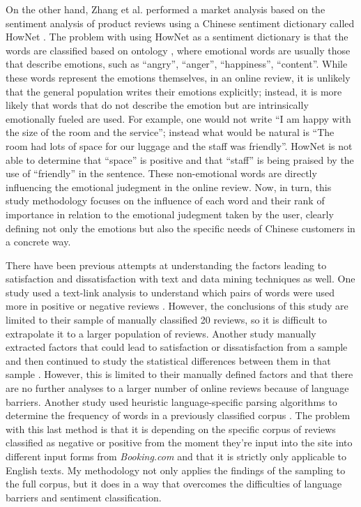 \documentclass[review]{elsarticle}
\begin{document}
On the other hand, Zhang et al. performed a market analysis based on the sentiment analysis of product reviews using a Chinese sentiment dictionary called HowNet \cite{zhang2011}. The problem with using HowNet as a sentiment dictionary is that the words are classified based on ontology \cite{huang2008}, where emotional words are usually those that describe emotions, such as “angry”, “anger”, “happiness”, “content”. While these words represent the emotions themselves, in an online review, it is unlikely that the general population writes their emotions explicitly; instead, it is more likely that words that do not describe the emotion but are intrinsically emotionally fueled are used. For example, one would not write “I am happy with the size of the room and the service”; instead what would be natural is “The room had lots of space for our luggage and the staff was friendly”. HowNet is not able to determine that “space” is positive and that “staff” is being praised by the use of “friendly” in the sentence. These non-emotional words are directly influencing the emotional judegment in the online review. Now, in turn, this study methodology focuses on the influence of each word and their rank of importance in relation to the emotional judegment taken by the user, clearly defining not only the emotions but also the specific needs of Chinese customers in a concrete way.

There have been previous attempts at understanding the factors leading to satisfaction and dissatisfaction with text and data mining techniques as well. One study used a text-link analysis to understand which pairs of words were used more in positive or negative reviews \cite{berezina2016}. However, the conclusions of this study are limited to their sample of manually classified 20 reviews, so it is difficult to extrapolate it to a larger population of reviews. Another study manually extracted factors that could lead to satisfaction or dissatisfaction from a sample and then continued to study the statistical differences between them in that sample \cite{zhou2014}. However, this is limited to their manually defined factors and that there are no further analyses to a larger number of online reviews because of language barriers. Another study used heuristic language-specific parsing algorithms to determine the frequency of words in a previously classified corpus \cite{xu2016}. The problem with this last method is that it is depending on the specific corpus of reviews classified as negative or positive from the moment they're input into the site into different input forms from \textit{Booking.com} and that it is strictly only applicable to English texts. My methodology not only applies the findings of the sampling to the full corpus, but it does in a way that overcomes the difficulties of language barriers and sentiment classification.
\end{document}
